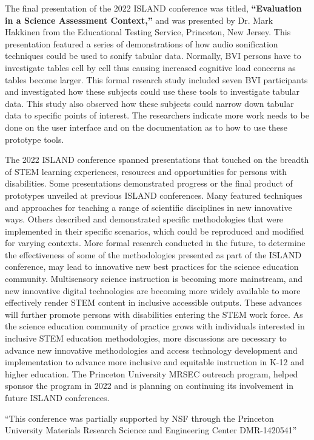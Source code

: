 \documentclass[11.5pt]{sig-alternate}
\begin{document}
\begin{large}
The final presentation of the 2022 ISLAND conference was titled, \textbf{“Evaluation in a Science Assessment Context,”} and was presented by Dr. Mark Hakkinen from the Educational Testing Service, Princeton, New Jersey. This presentation featured a series of demonstrations of how audio sonification techniques could be used to sonify tabular data. Normally, BVI persons have to investigate tables cell by cell thus causing increased cognitive load concerns as tables become larger. This formal research study included seven BVI participants and investigated how these subjects could use these tools to investigate tabular data. This study also observed how these subjects could narrow down tabular data to specific points of interest. The researchers indicate more work needs to be done on the user interface and on the documentation as to how to use these prototype tools.

The 2022 ISLAND conference spanned presentations that touched on the breadth of STEM learning experiences, resources and opportunities for persons with disabilities. Some presentations demonstrated progress or the final product of prototypes unveiled at previous ISLAND conferences. Many featured techniques and approaches for teaching a range of scientific disciplines in new innovative ways. Others described and demonstrated specific methodologies that were implemented in their specific scenarios, which could be reproduced and modified for varying contexts.  More formal research conducted in the future, to determine the effectiveness of some of the methodologies presented as part of the ISLAND conference, may lead to innovative new best practices for the science education community. Multisensory science instruction is becoming more mainstream, and new innovative digital technologies are becoming more widely available to more effectively render STEM content in inclusive accessible outputs. These advances will further promote persons with disabilities entering the STEM work force. As the science education community of practice grows with individuals interested in inclusive STEM education methodologies, more discussions are necessary to advance new innovative methodologies and access technology development and implementation to advance more inclusive and equitable instruction in K-12 and higher education.  The Princeton University MRSEC outreach program, helped sponsor the program in 2022 and is planning on continuing its involvement in future ISLAND conferences.

“This conference was partially supported by NSF through the Princeton University Materials Research Science and Engineering Center DMR-1420541”
 

\end{large}
\end{document}
